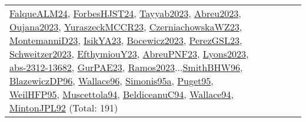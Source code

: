 {\begin{longtable}{p{3cm}r>{\raggedright\arraybackslash}p{6cm}>{\raggedright\arraybackslash}p{6cm}>{\raggedright\arraybackslash}p{8cm}}
\hyperref[detail:FalqueALM24]{FalqueALM24}, \hyperref[detail:ForbesHJST24]{ForbesHJST24}, \hyperref[detail:Tayyab2023]{Tayyab2023}, \hyperref[detail:Abreu2023]{Abreu2023}, \hyperref[detail:Oujana2023]{Oujana2023}, \hyperref[detail:YuraszeckMCCR23]{YuraszeckMCCR23}, \hyperref[detail:CzerniachowskaWZ23]{CzerniachowskaWZ23}, \hyperref[detail:MontemanniD23]{MontemanniD23}, \hyperref[detail:IsikYA23]{IsikYA23}, \hyperref[detail:Bocewicz2023]{Bocewicz2023}, \hyperref[detail:PerezGSL23]{PerezGSL23}, \hyperref[detail:Schweitzer2023]{Schweitzer2023}, \hyperref[detail:EfthymiouY23]{EfthymiouY23}, \hyperref[detail:AbreuPNF23]{AbreuPNF23}, \hyperref[detail:Lyons2023]{Lyons2023}, \hyperref[detail:abs-2312-13682]{abs-2312-13682}, \hyperref[detail:GurPAE23]{GurPAE23}, \hyperref[detail:Ramos2023]{Ramos2023}...\hyperref[detail:SmithBHW96]{SmithBHW96}, \hyperref[detail:BlazewiczDP96]{BlazewiczDP96}, \hyperref[detail:Wallace96]{Wallace96}, \hyperref[detail:Simonis95a]{Simonis95a}, \hyperref[detail:Puget95]{Puget95}, \hyperref[detail:WeilHFP95]{WeilHFP95}, \hyperref[detail:Muscettola94]{Muscettola94}, \hyperref[detail:BeldiceanuC94]{BeldiceanuC94}, \hyperref[detail:Wallace94]{Wallace94}, \hyperref[detail:MintonJPL92]{MintonJPL92} (Total: 191)\\

\end{longtable}}
